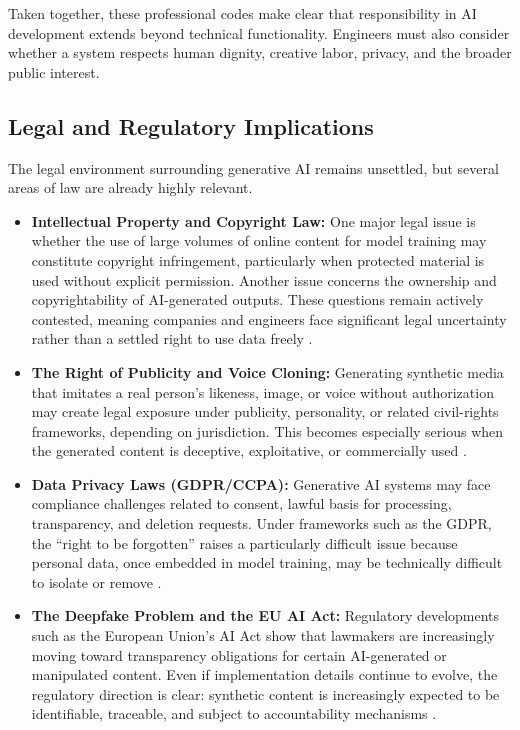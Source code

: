 Taken together, these professional codes make clear that responsibility in AI development extends beyond technical functionality. Engineers must also consider whether a system respects human dignity, creative labor, privacy, and the broader public interest.

\subsection{Legal and Regulatory Implications}

The legal environment surrounding generative AI remains unsettled, but several areas of law are already highly relevant.

\begin{itemize}
    \item \textbf{Intellectual Property and Copyright Law:} One major legal issue is whether the use of large volumes of online content for model training may constitute copyright infringement, particularly when protected material is used without explicit permission. Another issue concerns the ownership and copyrightability of AI-generated outputs. These questions remain actively contested, meaning companies and engineers face significant legal uncertainty rather than a settled right to use data freely \cite{fair-use}.

    \item \textbf{The Right of Publicity and Voice Cloning:} Generating synthetic media that imitates a real person's likeness, image, or voice without authorization may create legal exposure under publicity, personality, or related civil-rights frameworks, depending on jurisdiction. This becomes especially serious when the generated content is deceptive, exploitative, or commercially used \cite{juzonvoice}.

    \item \textbf{Data Privacy Laws (GDPR/CCPA):} Generative AI systems may face compliance challenges related to consent, lawful basis for processing, transparency, and deletion requests. Under frameworks such as the GDPR, the ``right to be forgotten'' raises a particularly difficult issue because personal data, once embedded in model training, may be technically difficult to isolate or remove \cite{gdpr}.

    \item \textbf{The Deepfake Problem and the EU AI Act:} Regulatory developments such as the European Union's AI Act show that lawmakers are increasingly moving toward transparency obligations for certain AI-generated or manipulated content. Even if implementation details continue to evolve, the regulatory direction is clear: synthetic content is increasingly expected to be identifiable, traceable, and subject to accountability mechanisms \cite{eu-par}.
\end{itemize}

